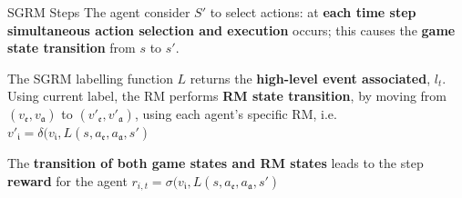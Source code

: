 \documentclass[10pt, aspectratio=169]{beamer}
\newcommand{\evidenzia}[1]{\textcolor{verdeSalvia}{\textbf{#1}}}
\begin{document}

\begin{frame}{SGRM Steps}
\vspace{0.2cm}
The agent consider $S'$ to select actions: at \evidenzia{each time step simultaneous action selection and execution} occurs; this causes the \evidenzia{game state transition} from $s$ to $s'$.
\vspace{0.2cm}

The SGRM labelling function $L$ returns the \evidenzia{high-level event associated}, $l_t$. Using current label, the RM performs \evidenzia{RM state transition}, by moving from $(v_\mathfrak{e},v_\mathfrak{a})$ to $(v'_\mathfrak{e},v'_\mathfrak{a})$, using each agent's specific RM, i.e. $v'_\mathfrak{i} = \delta(v_\mathfrak{i}, L(s, a_\mathfrak{e}, a_\mathfrak{a}, s')$
\vspace{0.5cm}

The \evidenzia{transition of both game states and RM states} leads to the step \evidenzia{reward} for the agent $r_{i,t} = \sigma(v_\mathfrak{i}, L(s, a_\mathfrak{e}, a_\mathfrak{a}, s')$
\end{frame}
\end{document}
